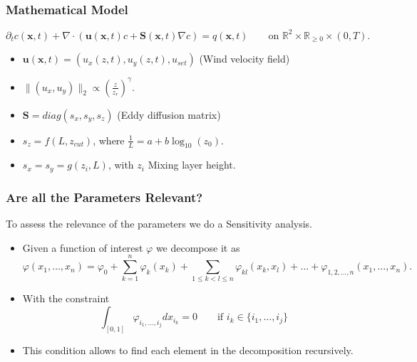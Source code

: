 \documentclass[11pt]{beamer}
\theoremstyle{plain}
\theoremstyle{definition}
\newcommand\ChangeFont{\fontsize{9}{7.2}\selectfont}
\begin{document}
\begin{frame}
\frametitle{Mathematical Model}
\begin{equation*}
\partial_{t} c(\textbf{x},t)+\nabla\cdot(\textbf{u}(\textbf{x},t)c+\textbf{S}(\textbf{x},t)\nabla c)
=q(\textbf{x},t)\qquad\text{on }\mathbb{R}^{2}\times\mathbb{R}_{\geq 0}\times(0,T).
\end{equation*}
\begin{itemize}
\item $\textbf{u}(\textbf{x},t)=(u_{x}(z,t),u_{y}(z,t),u_{set})$ 
(Wind velocity field)
\item $\|(u_{x},u_{y})\|_{2}\propto\left(\frac{z}{z_{r}}\right)^{\gamma}$.
\item $\textbf{S}=diag(s_{x},s_{y},s_{z})$ (Eddy diffusion matrix)
\item $s_{z}=f(L,z_{cut})$, where $\frac{1}{L}=a+b\log_{10}(z_{0})$.
\item $s_{x}=s_{y}=g(z_{i},L)$, with $z_{i}$ Mixing layer height.
\end{itemize}
\end{frame}

\begin{frame}
\frametitle{Are all the Parameters Relevant?}
\ChangeFont
To assess the relevance of the parameters we do a Sensitivity analysis.
\begin{itemize}
\item Given a function of interest $\varphi$ we decompose it as 
\begin{equation*}
\varphi(x_{1},\ldots,x_{n})=\varphi_{0}+\sum_{k=1}^{n}\varphi_{k}(x_{k})+
\sum_{1\leq k< l\leq n}\varphi_{kl}(x_{k},x_{l})+\ldots+
\varphi_{1,2,\ldots,n}(x_{1},\ldots,x_{n}).
\end{equation*}
\item With the constraint
\begin{equation}\label{eqnSobolCond1}
\int_{[0,1]}\varphi_{i_{1},\ldots,i_{j}}dx_{i_{k}}=0\qquad\text{if }  i_{k}\in \{i_{1},\ldots,i_{j}\}
\end{equation}
\item This condition allows to find each element in the decomposition recursively.
\end{itemize}
\end{frame}
\end{document}
